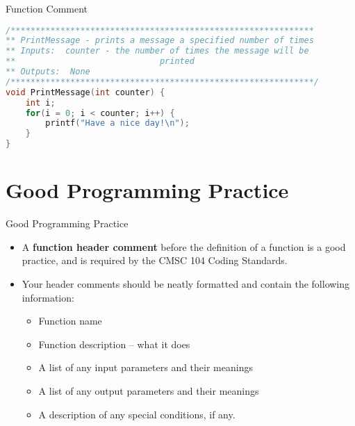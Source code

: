 \documentclass[graphics]{beamer}
\begin{document}
\begin{frame}[fragile]{Function Comment}
    \begin{lstlisting}[language=C,basicstyle=\footnotesize,keywordstyle=\color{blue},commentstyle=\color{green},showstringspaces=false,stringstyle=\color{red}]
/*************************************************************
** PrintMessage - prints a message a specified number of times
** Inputs:  counter - the number of times the message will be
**                             printed
** Outputs:  None
/*************************************************************/
void PrintMessage(int counter) {
    int i;
    for(i = 0; i < counter; i++) {
        printf("Have a nice day!\n");
    }
}
    \end{lstlisting}
\end{frame}

\section{Good Programming Practice}
\begin{frame}{Good Programming Practice}
    \begin{itemize}
        \item A \textbf{function header comment} before the definition of a function is a good practice, and is required by the CMSC 104 Coding Standards.
        \item Your header comments should be neatly formatted and contain the following information:
        \begin{itemize}
            \item Function name
            \item Function description -- what it does
            \item A list of any input parameters and their meanings
            \item A list of any output parameters and their meanings
            \item A description of any special conditions, if any.
        \end{itemize}
    \end{itemize}
\end{frame}
\end{document}
